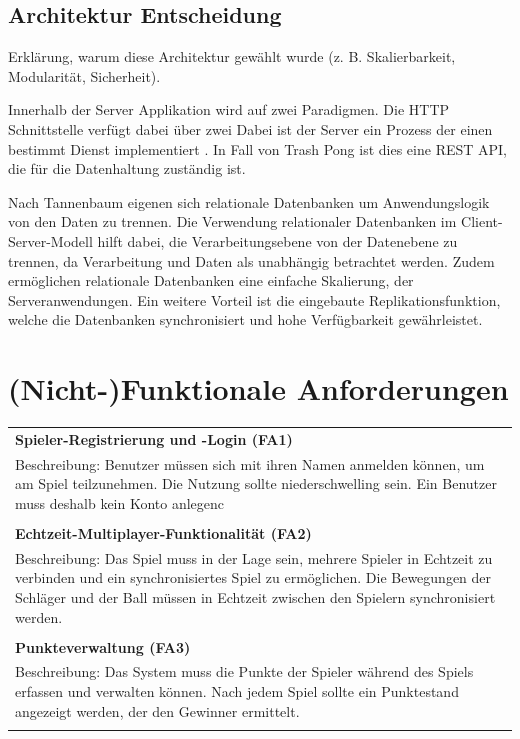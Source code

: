 \documentclass[
]{article}
\begin{document}
\hypertarget{section-achitactural-decision}{
\subsection{Architektur Entscheidung}}
Erklärung, warum diese Architektur gewählt wurde (z. B. Skalierbarkeit, Modularität, Sicherheit).

Innerhalb der Server Applikation wird auf zwei Paradigmen.
Die HTTP Schnittstelle verfügt dabei über zwei 
Dabei ist der Server \glqq ein Prozess der einen bestimmt Dienst implementiert\grqq{} \cite[S.55 ff.]{tanenbaum2007distributed}.
In Fall von Trash Pong ist dies eine REST API, die für die Datenhaltung zuständig ist.

Nach Tannenbaum eigenen sich relationale Datenbanken um Anwendungslogik von den Daten zu trennen.
\glqq Die Verwendung relationaler Datenbanken im Client-Server-Modell hilft dabei, 
die Verarbeitungsebene von der Datenebene zu trennen, da Verarbeitung und Daten als unabhängig betrachtet werden.\grqq{} \cite[S. 40 ff.]{tanenbaum2007distributed}
Zudem ermöglichen relationale Datenbanken eine einfache Skalierung, der Serveranwendungen.
Ein weitere Vorteil ist die eingebaute Replikationsfunktion, welche die Datenbanken synchronisiert und hohe Verfügbarkeit gewährleistet.\cite[Chapter 27]{postgresql-high-availability}


\section{(Nicht-)Funktionale Anforderungen}
\begin{center}
  \begin{tabular}{|p{\linewidth}|}
    \hline
    \textbf{Spieler-Registrierung und -Login (FA1)} \\
    Beschreibung: Benutzer müssen sich mit ihren Namen anmelden können, um am Spiel teilzunehmen.
    Die Nutzung sollte niederschwelling sein. Ein Benutzer muss deshalb kein Konto anlegenc \\ \\
    \hline
    \textbf{Echtzeit-Multiplayer-Funktionalität (FA2)} \\
    Beschreibung: Das Spiel muss in der Lage sein, mehrere Spieler in Echtzeit zu verbinden und ein synchronisiertes Spiel zu ermöglichen. Die Bewegungen der Schläger und der Ball müssen in Echtzeit zwischen den Spielern synchronisiert werden.\\ \\
    \hline
    \textbf{Punkteverwaltung (FA3)} \\
    Beschreibung: Das System muss die Punkte der Spieler während des Spiels erfassen und verwalten können. Nach jedem Spiel sollte ein Punktestand angezeigt werden, der den Gewinner ermittelt. \\ \\
    \hline
  \end{tabular}
\end{center}
\end{document}
